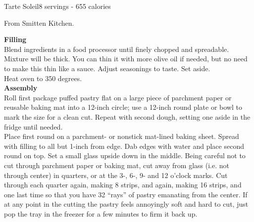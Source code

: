 \begin{recipe}{Tarte Soleil}{8 servings - 655 calories}{}

\freeform From Smitten Kitchen.


\textbf{Filling}\\

Blend ingredients in a food processor until finely chopped and spreadable. Mixture will be thick. You can thin it with more olive oil if needed, but no need to make this thin like a sauce. Adjust seasonings to taste. Set aside.\\

Heat oven to 350 degrees.\\

\textbf{Assembly}\\

Roll first package puffed pastry flat on a large piece of parchment paper or reusable baking mat into a 12-inch circle; use a 12-inch round plate or bowl to mark the size for a clean cut. Repeat with second dough, setting one aside in the fridge until needed.\\

Place first round on a parchment- or nonstick mat-lined baking sheet. Spread with filling to all but 1-inch from edge. Dab edges with water and place second round on top. Set a small glass upside down in the middle. Being careful not to cut through parchment paper or baking mat, cut away from glass (i.e. not through center) in quarters, or at the 3-, 6-, 9- and 12 o’clock marks. Cut through each quarter again, making 8 strips, and again, making 16 strips, and one last time so that you have 32 “rays” of pastry emanating from the center. If at any point in the cutting the pastry feels annoyingly soft and hard to cut, just pop the tray in the freezer for a few minutes to firm it back up.\\


\end{recipe}
